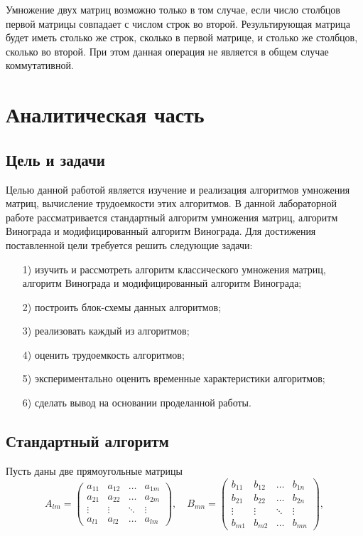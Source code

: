 \documentclass[12pt]{report}
\begin{document}
Умножение двух матриц возможно только в том случае, если число столбцов первой матрицы совпадает с числом строк во второй. Результирующая матрица будет иметь столько же строк, сколько в первой матрице, и столько же столбцов, сколько во второй. При этом данная операция не является в общем случае коммутативной.

	
	\chapter{Аналитическая часть}
	
	\section{Цель и задачи}
	
	Целью данной работой является изучение и реализация алгоритмов умножения матриц, вычисление трудоемкости этих алгоритмов. В данной лабораторной работе рассматривается стандартный алгоритм умножения матриц, алгоритм Винограда и модифицированный алгоритм Винограда. Для достижения поставленной цели требуется решить следующие задачи:
	
	\begin{enumerate}
		\item[1)] изучить и рассмотреть алгоритм классического умножения матриц, алгоритм Винограда и модифицированный алгоритм Винограда; 
		\item[2)] построить блок-схемы данных алгоритмов;
		\item[3)] реализовать каждый из алгоритмов;
		\item[4)] оценить трудоемкость алгоритмов;
		\item[5)] экспериментально оценить временные характеристики алгоритмов;
		\item[6)] сделать вывод на основании проделанной работы.
	\end{enumerate}
	
	
	\section{Стандартный алгоритм}
	
	Пусть даны две прямоугольные матрицы
	\begin{equation}
		A_{lm} = \begin{pmatrix}
			a_{11} & a_{12} & \ldots & a_{1m}\\
			a_{21} & a_{22} & \ldots & a_{2m}\\
			\vdots & \vdots & \ddots & \vdots\\
			a_{l1} & a_{l2} & \ldots & a_{lm}
		\end{pmatrix},
		\quad
			B_{mn} = \begin{pmatrix}
			b_{11} & b_{12} & \ldots & b_{1n}\\
			b_{21} & b_{22} & \ldots & b_{2n}\\
			\vdots & \vdots & \ddots & \vdots\\
			b_{m1} & b_{m2} & \ldots & b_{mn}
		\end{pmatrix},
	\end{equation}
\end{document}
